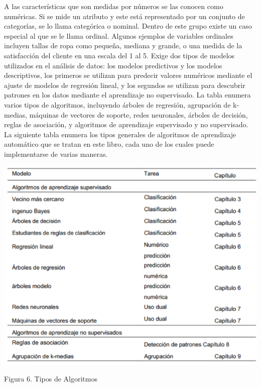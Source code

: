 \documentclass[
  letterpaper,
  DIV=11,
  numbers=noendperiod]{scrartcl}
\begin{document}
A las características que son medidas por números se las conocen como
numéricas. Si se mide un atributo y este está representado por un
conjunto de categorías, se lo llama categórica o nominal. Dentro de este
grupo existe un caso especial al que se le llama ordinal. Algunos
ejemplos de variables ordinales incluyen tallas de ropa como pequeña,
mediana y grande, o una medida de la satisfacción del cliente en una
escala del 1 al 5. Exige dos tipos de modelos utilizados en el análisis
de datos: los modelos predictivos y los modelos descriptivos, los
primeros se utilizan para predecir valores numéricos mediante el ajuste
de modelos de regresión lineal, y los segundos se utilizan para
descubrir patrones en los datos mediante el aprendizaje no supervisado.
La tabla enumera varios tipos de algoritmos, incluyendo árboles de
regresión, agrupación de k-medias, máquinas de vectores de soporte,
redes neuronales, árboles de decisión, reglas de asociación, y
algoritmos de aprendizaje supervisado y no supervisado. La siguiente
tabla enumera los tipos generales de algoritmos de aprendizaje
automático que se tratan en este libro, cada uno de los cuales puede
implementarse de varias maneras.

\begin{Figura 6. Tipos de Algoritmos}

{\centering \includegraphics{cap6.png}

}

\caption{Figura 6. Tipos de Algoritmos}

\end{Figura 6. Tipos de Algoritmos}
\end{document}
